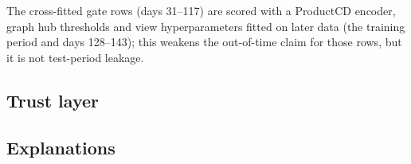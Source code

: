 The cross-fitted gate rows (days 31--117) are scored with a ProductCD encoder, graph hub
thresholds and view hyperparameters fitted on later data (the training period and days
128--143); this weakens the out-of-time claim for those rows, but it is not test-period leakage.

\subsection{Trust layer}

\subsection{Explanations}

